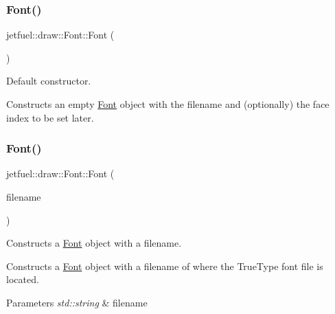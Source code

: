 \subsubsection{\texorpdfstring{Font()}{Font()}\hspace{0.1cm}{\footnotesize\ttfamily [1/3]}}
{\footnotesize\ttfamily jetfuel\+::draw\+::\+Font\+::\+Font (\begin{DoxyParamCaption}{ }\end{DoxyParamCaption})\hspace{0.3cm}{\ttfamily [inline]}}



Default constructor. 

Constructs an empty \hyperlink{classjetfuel_1_1draw_1_1Font}{Font} object with the filename and (optionally) the face index to be set later. \mbox{\label{classjetfuel_1_1draw_1_1Font_a96db43b28c32511ff481502ec8d11fd7}} 
\subsubsection{\texorpdfstring{Font()}{Font()}\hspace{0.1cm}{\footnotesize\ttfamily [2/3]}}
{\footnotesize\ttfamily jetfuel\+::draw\+::\+Font\+::\+Font (\begin{DoxyParamCaption}\item[{const std\+::string}]{filename }\end{DoxyParamCaption})}



Constructs a \hyperlink{classjetfuel_1_1draw_1_1Font}{Font} object with a filename. 

Constructs a \hyperlink{classjetfuel_1_1draw_1_1Font}{Font} object with a filename of where the True\+Type font file is located.


\begin{DoxyParams}{Parameters}
{\em std\+::string} & filename \\
\hline
\end{DoxyParams}
\mbox{\label{classjetfuel_1_1draw_1_1Font_a5907cc1ecc14725d642ef5c3c753ced9}} 
